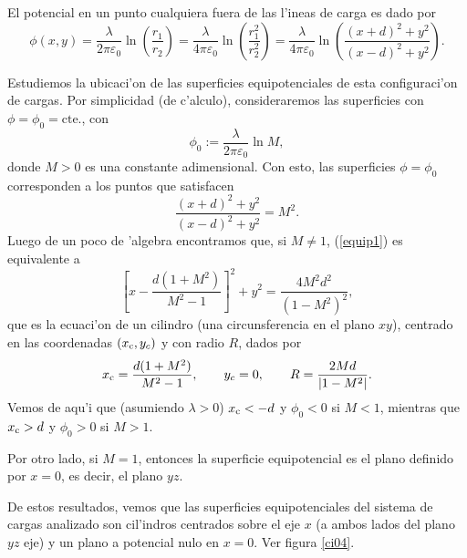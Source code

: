 El potencial en un punto cualquiera fuera de las l'ineas de carga es dado por
\begin{equation}
 \phi(x,y)=\frac{\lambda}{2\pi\varepsilon_0}\ln\left(\frac{r_1}{r_2}
\right)=\frac{\lambda}{4\pi\varepsilon_0}\ln\left(\frac{r_1^2}{r_2^2}
\right)=\frac{\lambda}{4\pi\varepsilon_0}\ln\left(\frac{(x+d)^2+y^2}{
(x-d)^2+y^2}\right).
\end{equation}

Estudiemos la ubicaci'on de las superficies equipotenciales de esta
configuraci'on de cargas. Por simplicidad (de c'alculo), consideraremos las superficies con $\phi=\phi_0=\text{cte.}$, con
\begin{equation}
 \phi_0:=\frac{\lambda}{2\pi\varepsilon_0}\ln M, \label{phi0M}
\end{equation}
donde $M>0$ es una constante adimensional.  Con esto, las superficies $\phi=\phi_0$
corresponden a los puntos que satisfacen
\begin{equation}
 \frac{(x+d)^2+y^2}{(x-d)^2+y^2}=M^2. \label{equip1}
\end{equation}
Luego de un poco de 'algebra encontramos que, si $M\neq 1$, (\ref{equip1}) es
equivalente a
\begin{equation}
 \left[x-\frac{d(1+M^2)}{M^2-1}\right]^2+y^2=\frac{4M^2d^2}{(1-M^2)^2},
\end{equation}
que es la ecuaci'on de un cilindro (una circunsferencia en el plano $xy$),
centrado en las coordenadas $(x_{\rm c},y_c)$ y con radio $R$, dados por
\begin{equation}
 x_{\rm c}=\frac{d(1+M^2)}{M^2-1}, \qquad y_c=0, \qquad R=\frac{2Md}{|1-M^2|}.
\label{cilim}
\end{equation}
Vemos de aqu'i que (asumiendo $\lambda>0$) $x_{\rm c}<-d$ y $\phi_0<0$ si $M<1$,
mientras que $x_{\rm c}>d$ y $\phi_0>0$ si $M>1$.

Por otro lado, si $M=1$, entonces la superficie equipotencial es el plano
definido por $x=0$, es decir, el plano $yz$.

De estos resultados, vemos que las superficies equipotenciales del sistema de
cargas analizado son cil'indros centrados sobre el eje $x$ (a ambos lados del
plano $yz$ eje) y un plano a potencial nulo en $x=0$. Ver figura \ref{ci04}.
%

